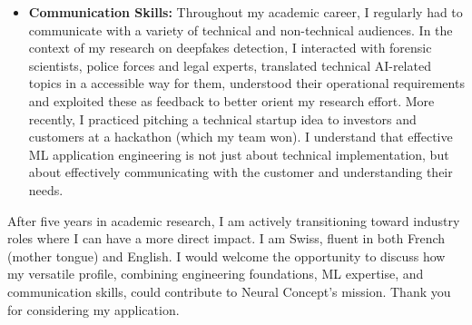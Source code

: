 \documentclass[11pt, a4paper]{awesome-cv}
\begin{document}
\begin{cvletter}
\begin{itemize}
\item\textbf{Communication Skills:} Throughout my academic career, I regularly had to communicate with a variety of technical and non-technical audiences. In the context of my research on deepfakes detection, I interacted with forensic scientists, police forces and legal experts, translated technical AI-related topics in a accessible way for them, understood their operational requirements and exploited these as feedback to better orient my research effort. More recently, I practiced pitching a technical startup idea to investors and customers at a hackathon (which my team won). I understand that effective ML application engineering is not just about technical implementation, but about effectively communicating with the customer and understanding their needs.
\end{itemize}

After five years in academic research, I am actively transitioning toward industry roles where I can have a more direct impact. I am Swiss, fluent in both French (mother tongue) and English. I would welcome the opportunity to discuss how my versatile profile, combining engineering foundations, ML expertise, and communication skills, could contribute to Neural Concept's mission. Thank you for considering my application.
\end{cvletter}


\makeletterclosing
\end{document}
